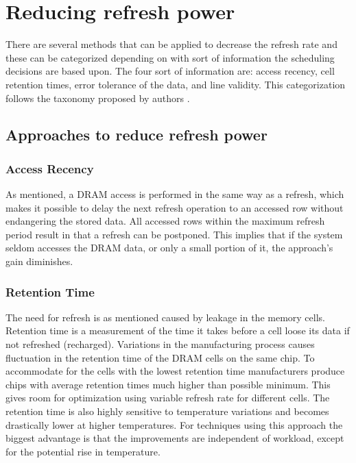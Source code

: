 \section{Reducing refresh power} 
\label{sec:red}
There are several methods that can be applied to decrease the refresh rate and these can be categorized depending on with sort of information the scheduling decisions are based upon. The four sort of information are: access recency, cell retention times, error tolerance of the data, and line validity. This categorization follows the taxonomy proposed by authors \cite{dtail}. 

\subsection{Approaches to reduce refresh power}

\subsubsection*{\textbf{Access Recency}}
As mentioned, a DRAM access is performed in the same way as a refresh, which makes it possible to delay the next refresh operation to an accessed row without endangering the stored data. All accessed rows within the maximum refresh period result in that a refresh can be postponed. This implies that if the system seldom accesses the DRAM data, or only a small portion of it, the approach's gain diminishes.


\subsubsection*{\textbf{Retention Time}}
The need for refresh is as mentioned caused by leakage in the memory cells. Retention time is a measurement of the time it takes before a cell loose its data if not refreshed (recharged). Variations in the manufacturing process causes fluctuation in the retention time of the DRAM cells on the same chip. To accommodate for the cells with the lowest retention time manufacturers produce chips with average retention times much higher than possible minimum. This gives room for optimization using variable refresh rate for different cells. The retention time is also highly sensitive to temperature variations and becomes drastically lower at higher temperatures. For techniques using this approach the biggest advantage is that the improvements are independent of workload, except for the potential rise in temperature.   

